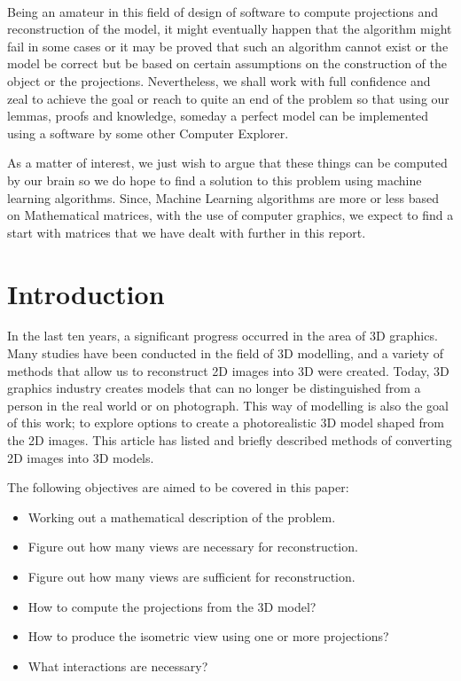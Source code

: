 \documentclass[12pt]{report}
\begin{document}
\\
\vspace{0.2cm}

Being an amateur in this field of design of software to compute projections and reconstruction of the model, it might eventually happen that the algorithm might fail in some cases or it may be proved that such an algorithm cannot exist or the model be correct but be based on certain assumptions on the construction of the object or the projections. Nevertheless, we shall work with full confidence and zeal to achieve the goal or reach to quite an end of the problem so that using our lemmas, proofs and knowledge, someday a perfect model can be implemented using a software by some other Computer Explorer. 
\\
\vspace{0.2cm}

As a matter of interest, we just wish to argue that these things can be computed by our brain so we do hope to find a solution to this problem using machine learning algorithms. Since, Machine Learning algorithms are more or less based on Mathematical matrices, with the use of computer graphics, we expect to find a start with matrices that we have dealt with further in this report. 

\newpage

\tableofcontents

\newpage

\chapter{Introduction}

In the last ten years, a significant progress occurred in the area of 3D graphics. Many studies have been conducted in the field of 3D modelling, and a variety of methods that allow us to reconstruct 2D images into 3D were created. Today, 3D graphics industry creates models that can no longer be distinguished from a person in the real world or on photograph. This way of modelling is also the goal of this work; to explore options to create a photorealistic 3D model shaped from the 2D images. This article has listed and briefly described methods of converting 2D images into 3D models.
\vspace{1cm}

The following objectives are aimed to be covered in this paper:

\begin{itemize}
  \item
  Working out a mathematical description of the problem.
  \item
  Figure out how many views are necessary for reconstruction.
  \item
  Figure out how many views are sufficient for reconstruction.
  \item
  How to compute the projections from the 3D model?
  \item
  How to produce the isometric view using one or more projections?
  \item
  What interactions are necessary?
  
\end{itemize}
\end{document}
